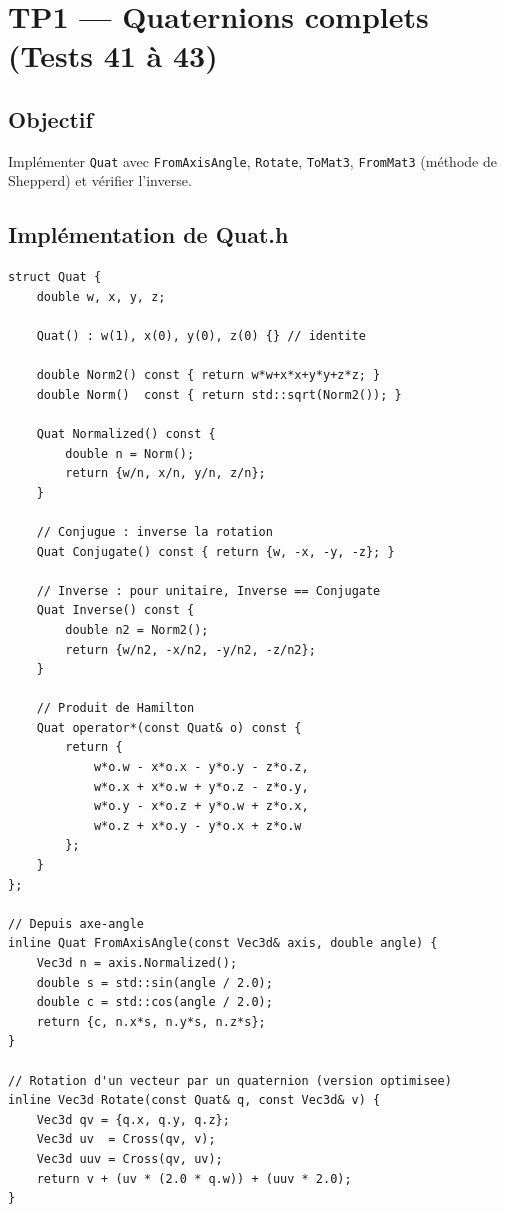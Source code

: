 \documentclass[12pt,a4paper]{report}
\begin{document}
\section{TP1 --- Quaternions complets (Tests 41 à 43)}

\subsection{Objectif}

Implémenter \texttt{Quat} avec \texttt{FromAxisAngle}, \texttt{Rotate},
\texttt{ToMat3}, \texttt{FromMat3} (méthode de Shepperd) et vérifier
l'inverse.

\subsection{Implémentation de Quat.h}

\begin{lstlisting}[caption={Quat.h --- structure complete}]
struct Quat {
    double w, x, y, z;

    Quat() : w(1), x(0), y(0), z(0) {} // identite

    double Norm2() const { return w*w+x*x+y*y+z*z; }
    double Norm()  const { return std::sqrt(Norm2()); }

    Quat Normalized() const {
        double n = Norm();
        return {w/n, x/n, y/n, z/n};
    }

    // Conjugue : inverse la rotation
    Quat Conjugate() const { return {w, -x, -y, -z}; }

    // Inverse : pour unitaire, Inverse == Conjugate
    Quat Inverse() const {
        double n2 = Norm2();
        return {w/n2, -x/n2, -y/n2, -z/n2};
    }

    // Produit de Hamilton
    Quat operator*(const Quat& o) const {
        return {
            w*o.w - x*o.x - y*o.y - z*o.z,
            w*o.x + x*o.w + y*o.z - z*o.y,
            w*o.y - x*o.z + y*o.w + z*o.x,
            w*o.z + x*o.y - y*o.x + z*o.w
        };
    }
};

// Depuis axe-angle
inline Quat FromAxisAngle(const Vec3d& axis, double angle) {
    Vec3d n = axis.Normalized();
    double s = std::sin(angle / 2.0);
    double c = std::cos(angle / 2.0);
    return {c, n.x*s, n.y*s, n.z*s};
}

// Rotation d'un vecteur par un quaternion (version optimisee)
inline Vec3d Rotate(const Quat& q, const Vec3d& v) {
    Vec3d qv = {q.x, q.y, q.z};
    Vec3d uv  = Cross(qv, v);
    Vec3d uuv = Cross(qv, uv);
    return v + (uv * (2.0 * q.w)) + (uuv * 2.0);
}
\end{lstlisting}
\end{document}
